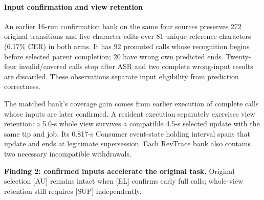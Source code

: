 \paragraph{Input confirmation and view retention}
An earlier 16-run confirmation bank on the same four sources preserves 272 original transitions
and five character edits over 81 unique reference characters (6.17\% CER)
in both arms. It has 92 promoted calls whose recognition
begins before selected parent completion; 20 have wrong own predicted
ends. Twenty-four invalid/covered calls stop after ASR and two complete
wrong-input results are discarded. These observations separate input
eligibility from prediction correctness.

The matched bank's coverage gain comes from earlier execution of complete
calls whose inputs are later confirmed. A resident execution separately
exercises view retention: a 5.0-s whole view survives a compatible 4.5-s
selected update with the same tip and job. Its 0.817-s Consumer event-state
holding interval spans that update and ends at legitimate supersession.
Each RevTrace bank also contains two necessary incompatible withdrawals.
\par\noindent\textbf{Finding 2: confirmed inputs accelerate the original task.}
Original selection [AU] remains intact when [EL] confirms early full calls;
whole-view retention still requires [SUP] independently.
